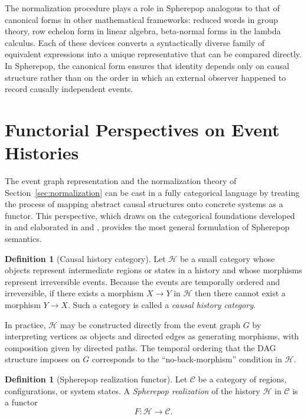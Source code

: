 \documentclass[12pt]{article}
\theoremstyle{plain}
\theoremstyle{definition}
\newtheorem{definition}[theorem]{Definition}
\theoremstyle{remark}
\begin{document}
The normalization procedure plays a role in Spherepop analogous to that of
canonical forms in other mathematical frameworks: reduced words in group theory,
row echelon form in linear algebra, beta-normal forms in the lambda calculus.
Each of these devices converts a syntactically diverse family of equivalent
expressions into a unique representative that can be compared directly.  In
Spherepop, the canonical form ensures that identity depends only on causal
structure rather than on the order in which an external observer happened to
record causally independent events.


\section{Functorial Perspectives on Event Histories}
\label{sec:functors}

The event graph representation and the normalization theory of
Section~\ref{sec:normalization} can be cast in a fully categorical language by
treating the process of mapping abstract causal structures onto concrete systems
as a functor.  This perspective, which draws on the categorical foundations
developed in \citet{MacLane1998} and elaborated in \citet{Spivak2014} and
\citet{BaezStay2010}, provides the most general formulation of Spherepop
semantics.

\begin{definition}[Causal history category]
Let $\mathcal{H}$ be a small category whose objects represent intermediate
regions or states in a history and whose morphisms represent irreversible
events.  Because the events are temporally ordered and irreversible, if there
exists a morphism $X \rightarrow Y$ in $\mathcal{H}$ then there cannot exist
a morphism $Y \rightarrow X$.  Such a category is called a \emph{causal
history category}.
\end{definition}

In practice, $\mathcal{H}$ may be constructed directly from the event graph
$G$ by interpreting vertices as objects and directed edges as generating
morphisms, with composition given by directed paths.  The temporal ordering
that the DAG structure imposes on $G$ corresponds to the ``no-back-morphism''
condition in $\mathcal{H}$.

\begin{definition}[Spherepop realization functor]
Let $\mathcal{C}$ be a category of regions, configurations, or system states.
A \emph{Spherepop realization} of the history $\mathcal{H}$ in $\mathcal{C}$
is a functor
\[
  F : \mathcal{H} \rightarrow \mathcal{C}.
\]
\end{definition}
\end{document}
